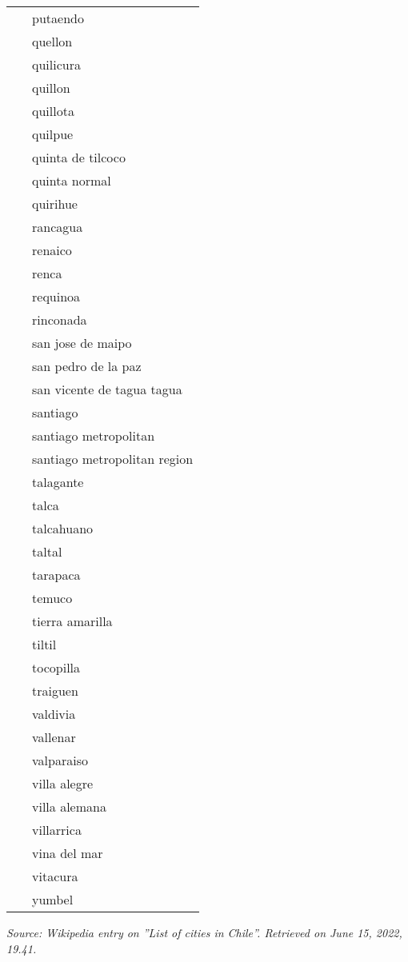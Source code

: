 \begin{longtable}{l|l}
                ~ &    putaendo   \\   
                ~ &    quellon   \\   
                ~ &    quilicura   \\   
                ~ &    quillon   \\   
                ~ &    quillota   \\   
                ~ &    quilpue   \\   
                ~ &    quinta de tilcoco   \\   
                ~ &    quinta normal   \\   
                ~ &    quirihue   \\   
                ~ &    rancagua   \\   
                ~ &    renaico   \\   
                ~ &    renca   \\   
                ~ &    requinoa   \\   
                ~ &    rinconada   \\   
                ~ &    san jose de maipo   \\   
                ~ &    san pedro de la paz   \\   
                ~ &    san vicente de tagua tagua   \\   
                ~ &    santiago   \\   
                ~ &    santiago metropolitan   \\   
                ~ &    santiago metropolitan region   \\   
                ~ &    talagante   \\   
                ~ &    talca   \\   
                ~ &    talcahuano   \\   
                ~ &    taltal   \\   
                ~ &    tarapaca   \\   
                ~ &    temuco   \\   
                ~ &    tierra amarilla   \\   
                ~ &    tiltil   \\   
                ~ &    tocopilla   \\   
                ~ &    traiguen   \\   
                ~ &    valdivia   \\   
                ~ &    vallenar   \\   
                ~ &    valparaiso   \\   
                ~ &    villa alegre   \\   
                ~ &    villa alemana   \\   
                ~ &    villarrica   \\   
                ~ &    vina del mar   \\   
                ~ & vitacura   \\   
                ~ & yumbel 
        \end{longtable}
        {\it Source: Wikipedia entry on ''List of cities in Chile''. Retrieved on June 15, 2022, 19.41.}
        

